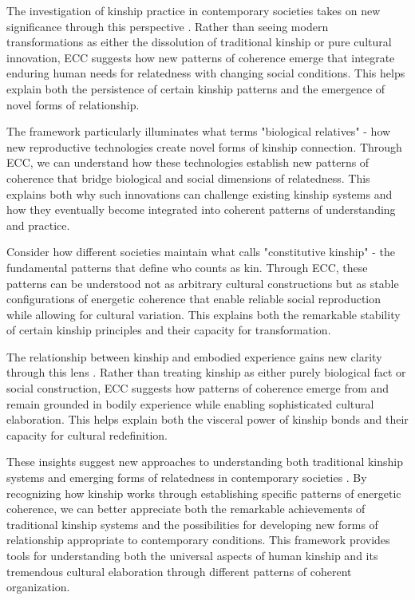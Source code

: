 The investigation of kinship practice in contemporary societies takes on new significance through this perspective \cite{carsten2004after}. Rather than seeing modern transformations as either the dissolution of traditional kinship or pure cultural innovation, ECC suggests how new patterns of coherence emerge that integrate enduring human needs for relatedness with changing social conditions. This helps explain both the persistence of certain kinship patterns and the emergence of novel forms of relationship.

The framework particularly illuminates what \cite{franklin2013biological} terms "biological relatives" - how new reproductive technologies create novel forms of kinship connection. Through ECC, we can understand how these technologies establish new patterns of coherence that bridge biological and social dimensions of relatedness. This explains both why such innovations can challenge existing kinship systems and how they eventually become integrated into coherent patterns of understanding and practice.

Consider how different societies maintain what \cite{sahlins2013what} calls "constitutive kinship" - the fundamental patterns that define who counts as kin. Through ECC, these patterns can be understood not as arbitrary cultural constructions but as stable configurations of energetic coherence that enable reliable social reproduction while allowing for cultural variation. This explains both the remarkable stability of certain kinship principles and their capacity for transformation.

The relationship between kinship and embodied experience gains new clarity through this lens \cite{strathern1992after}. Rather than treating kinship as either purely biological fact or social construction, ECC suggests how patterns of coherence emerge from and remain grounded in bodily experience while enabling sophisticated cultural elaboration. This helps explain both the visceral power of kinship bonds and their capacity for cultural redefinition.

These insights suggest new approaches to understanding both traditional kinship systems and emerging forms of relatedness in contemporary societies \cite{carsten2000cultures}. By recognizing how kinship works through establishing specific patterns of energetic coherence, we can better appreciate both the remarkable achievements of traditional kinship systems and the possibilities for developing new forms of relationship appropriate to contemporary conditions. This framework provides tools for understanding both the universal aspects of human kinship and its tremendous cultural elaboration through different patterns of coherent organization.

